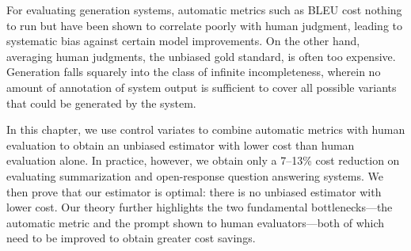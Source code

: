 For evaluating generation systems, automatic metrics such as BLEU cost nothing to run but have been shown to correlate poorly with human judgment, leading to systematic bias against certain model improvements.
On the other hand, averaging human judgments, the unbiased gold standard, is often too expensive.
Generation falls squarely into the class of infinite incompleteness, wherein no amount of annotation of system output is sufficient to cover all possible variants that could be generated by the system.

In this chapter, we use control variates to combine automatic metrics with human evaluation to
obtain an unbiased estimator with lower cost than human evaluation alone.
In practice, however, we obtain only a 7--13\% cost reduction on evaluating summarization and open-response question answering systems.
We then prove that our estimator is optimal: there is no unbiased estimator with lower cost.
Our theory further highlights the two fundamental bottlenecks---the automatic
metric and the prompt shown to human evaluators---both of which need to be improved to obtain greater cost savings.

